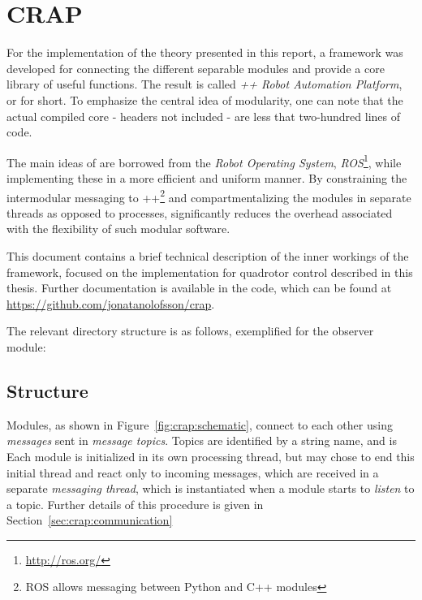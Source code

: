 \chapter{CRAP}
\label{app:crap}
    For the implementation of the theory presented in this report, a
    framework was developed for connecting the different separable modules
    and provide a core library of useful functions.
    The result is called \textit{\C++ Robot Automation Platform}, or \crap for short.
    To emphasize the central idea of modularity, one can note that the actual compiled
    core - headers not included - are less that two-hundred lines of code.

    The main ideas of \crap are borrowed from the \textit{Robot Operating System}, \textit{ROS}\footnote{\url{http://ros.org/}},
    while implementing these in a more efficient and uniform manner.
    By constraining the intermodular messaging to \C++\footnote{ROS allows messaging between Python and C++ modules} and compartmentalizing the
    modules in separate threads as opposed to processes, \crap significantly
    reduces the overhead associated with the flexibility of such modular software.

    This document contains a brief technical description of the inner workings of the framework,
    focused on the implementation for quadrotor control described in this thesis.
    Further documentation is available in the code, which can be found at
    \url{https://github.com/jonatanolofsson/crap}.

    The relevant directory structure is as follows,
    exemplified for the observer module:

    \begin{minipage}{\textwidth}
    \end{minipage}

    \section{Structure}
    \label{sec:crap:structure}
        Modules, as shown in Figure~\ref{fig:crap:schematic},
        connect to each other using \textit{messages} sent in \textit{message topics}.
        Topics are identified by a string name, and is
        Each module is initialized in its own processing thread, but may
        chose to end this initial thread and react only to
        incoming messages, which are received in a separate \textit{messaging thread},
        which is instantiated when a module starts to \textit{listen} to a topic.
        Further details of this procedure is given in Section~\ref{sec:crap:communication}

